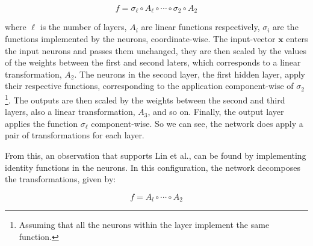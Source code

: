 \documentclass[11pt]{article}
\begin{document}
\begin{equation}f = \sigma_{\ell} \circ A_{\ell} \circ \cdots \circ \sigma_{2} \circ A_{2}\nonumber\end{equation}

where $\ell$ is the number of layers, $A_{i}$ are linear functions respectively, $\sigma_{i}$ are the functions implemented by the neurons, coordinate-wise. The input-vector $\textbf{x}$ enters the input neurons and passes them unchanged, they are then scaled by the values of the weights between the first and second laters, which corresponds to a linear transformation, $A_{2}$. The neurons in the second layer, the first hidden layer, apply their respective functions, corresponding to the application component-wise of $\sigma_{2}$\footnote{Assuming that all the neurons within the layer implement the same function.}. The outputs are then scaled by the weights between the second and third layers, also a linear transformation, $A_{3}$, and so on. Finally, the output layer applies the function $\sigma_{\ell}$ component-wise. So we can see, the network does apply a pair of transformations for each layer.

From this, an observation that supports Lin et al., can be found by implementing identity functions in the neurons. In this configuration, the network decomposes the transformations, given by:

\begin{equation}f = A_{l} \circ \cdots \circ A_{2}\nonumber\end{equation}
\end{document}
